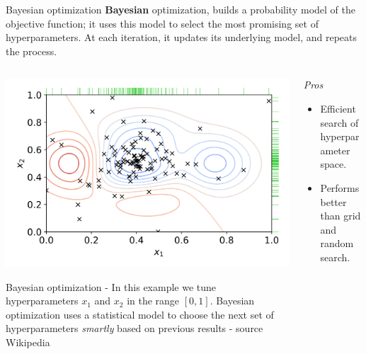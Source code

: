 \documentclass[9pt, aspectratio=169]{beamer}
\begin{document}
\begin{frame}
    {Bayesian optimization}
    \textbf{Bayesian} optimization, builds a probability model of the objective function; it uses this model to select the most promising set of hyperparameters. At each iteration, it updates its underlying model, and repeats the process.

    \begin{columns}
        \begin{column}{0.5\textwidth}
            \centering
            \includegraphics[width=\textwidth]{bayesian.png}

            \footnotesize
            Bayesian optimization - In this example we tune hyperparameters $x_1$ and $x_2$ in the range $[0,1]$. Bayesian optimization uses a statistical model to choose the next set of hyperparameters \textit{smartly} based on previous results - source Wikipedia
        \end{column}
        \begin{column}{.5\textwidth}
            {
                \textit{Pros}
                \begin{itemize}
                    \item Efficient search of hyperparameter space.
                    \item Performs better than grid and random search.
                \end{itemize}
            }
        \end{column}
    \end{columns}
\end{frame}
\end{document}
